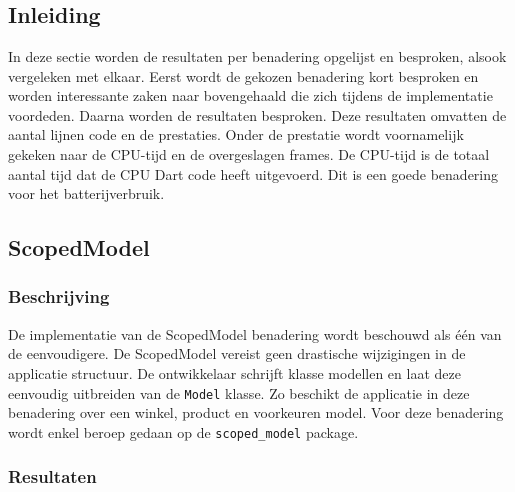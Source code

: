 

\chapter{}
\label{ch:experiment}

\section{Inleiding}
In deze sectie worden de resultaten per benadering opgelijst en besproken, alsook vergeleken met elkaar. Eerst wordt de gekozen benadering kort besproken en worden interessante zaken naar bovengehaald die zich tijdens de implementatie voordeden. Daarna worden de resultaten besproken. Deze resultaten omvatten de aantal lijnen code en de prestaties. \newline \newline Onder de prestatie wordt voornamelijk gekeken naar de CPU-tijd en de overgeslagen frames. De CPU-tijd is de totaal aantal tijd dat de CPU Dart code heeft uitgevoerd. Dit is een goede benadering voor het batterijverbruik.


\section{ScopedModel}
\subsection{Beschrijving}
De implementatie van de ScopedModel benadering wordt beschouwd als één van de eenvoudigere. De ScopedModel vereist geen drastische wijzigingen in de applicatie structuur. De ontwikkelaar schrijft klasse modellen en laat deze eenvoudig uitbreiden van de \verb|Model| klasse. Zo beschikt de applicatie in deze benadering over een winkel, product en voorkeuren model. \newline \newline
Voor deze benadering wordt enkel beroep gedaan op de \verb|scoped_model| package. 

\subsection{Resultaten}
